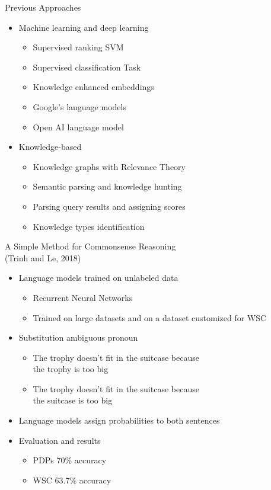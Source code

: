 \documentclass[smaller,dvipsnames,ratio=169]{beamer}
\begin{document}
\begin{frame}{Previous Approaches}
	\begin{itemize}
		\item Machine learning and deep learning
		\begin{itemize}
			\normalsize
			\item Supervised ranking SVM 
			\item Supervised classification Task 
			\item Knowledge enhanced embeddings 
			\item Google's language models 
			\item Open AI language model 
		\end{itemize}			
		\item Knowledge-based
		\begin{itemize}
			\normalsize
			\item Knowledge graphs with Relevance Theory 
			\item Semantic parsing and knowledge hunting 
			\item Parsing query results and assigning scores 
			\item Knowledge types identification 
		\end{itemize}
	\end{itemize}
\end{frame}

\begin{frame}{A Simple Method for Commonsense Reasoning\\ (Trinh and Le, 2018)}
	\begin{itemize}
		\normalsize
{}		\item \alert{Language models} trained on unlabeled data
		\begin{itemize}
			\normalsize
			\item Recurrent Neural Networks
			\item Trained on large datasets and on a dataset \alert{customized} for WSC
		\end{itemize}
		\item Substitution ambiguous pronoun
		\begin{itemize}
			\normalsize
			\item The trophy doesn't fit in the suitcase because\\ the \alert{trophy} is too big
			\item The trophy doesn't fit in the suitcase because\\ the \alert{suitcase} is too big
    	\end{itemize}
		\item Language models assign probabilities to both sentences

	\item Evaluation and results
		\begin{itemize}
			\normalsize
			\item PDPs 70\% accuracy
			\item WSC \alert{63.7\%} accuracy
		\end{itemize}
	\end{itemize}
\end{frame}
\end{document}
